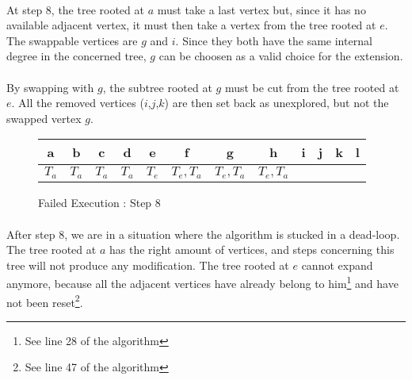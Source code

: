 \paragraph{}
At step 8, the tree rooted at $a$ must take a last vertex but, since it has no
available
adjacent vertex, it must then take a vertex from the tree rooted at $e$. The
swappable vertices are $g$ and $i$. Since they both have the
same internal degree in the concerned tree, $g$ can be choosen as a valid
choice for the extension.

\paragraph{}
By swapping with $g$, the subtree rooted at $g$ must be cut from the tree
rooted at $e$. All the removed vertices ($i$,$j$,$k$) are then set back as
unexplored, but not the swapped vertex $g$.

\begin{figure}[H]
  \caption{Failed Execution : Step 8}
  \begin{center}
    \begin{tikzpicture}[scale=0.9,transform shape]
      
    \end{tikzpicture}
    \begin{tabular}{|c|c|c|c|c|c|c|c|c|c|c|c|}
\hline
a & b & c & d & e & f & g & h & i & j & k & l\\
\hline
$T_a$ & $T_a$ & $T_a$ & $T_a$ & $T_e$ & $T_e, T_a$ & $T_e,T_a$ & $T_e, T_a$ & & &  &\\
\hline
    \end{tabular}
  \end{center}
\end{figure}

\paragraph{}
After step 8, we are in a situation where the algorithm is stucked in a
dead-loop. The tree rooted at $a$ has the right amount of vertices, and steps
concerning this tree will not produce any modification. The tree rooted at $e$
cannot expand anymore, because all the adjacent vertices have already belong to
him\footnote{See line 28 of the algorithm} and have not been reset\footnote{
See line 47 of the algorithm}.
